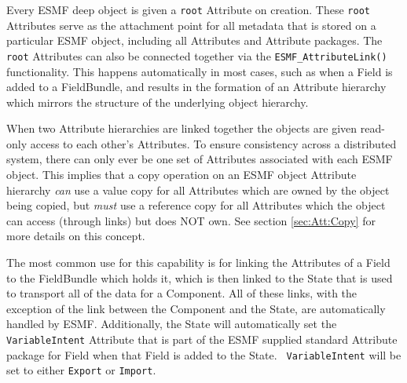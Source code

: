 Every ESMF deep object is given a {\tt root} Attribute on creation.
These {\tt root} Attributes serve as the attachment point for all metadata that 
is stored on a particular ESMF object, including all Attributes and
Attribute packages.  The {\tt root} Attributes can also be connected together via 
the {\tt ESMF\_AttributeLink()} functionality.  This happens automatically in most 
cases, such as when a Field is added to a FieldBundle, and results
in the formation of an Attribute hierarchy which mirrors the structure 
of the underlying object hierarchy.  

When two Attribute hierarchies are linked together 
the objects are given read-only access to each other's Attributes.
To ensure consistency across a distributed system, 
there can only ever be one set of Attributes associated with each ESMF object.  
This implies that a copy operation on an ESMF object Attribute hierarchy {\it can} 
use a value copy for all Attributes which are owned by the object being copied, 
but {\it must} use a reference copy for all Attributes which the object can 
access (through links) but does NOT own. See section \ref{sec:Att:Copy} for more
details on this concept.

The most common use for this capability is for linking the Attributes of a 
Field to the FieldBundle which holds it, which is then linked to the State that 
is used to transport all of the data for a Component.  All of these links, with 
the exception of the link between the Component and the State, are 
automatically handled by ESMF. Additionally, the State will automatically set 
the {\tt VariableIntent} Attribute that is part of the ESMF supplied standard 
Attribute package for Field when that Field is added to the State.  {\tt 
VariableIntent} will be set to either {\tt Export} or {\tt Import}.

